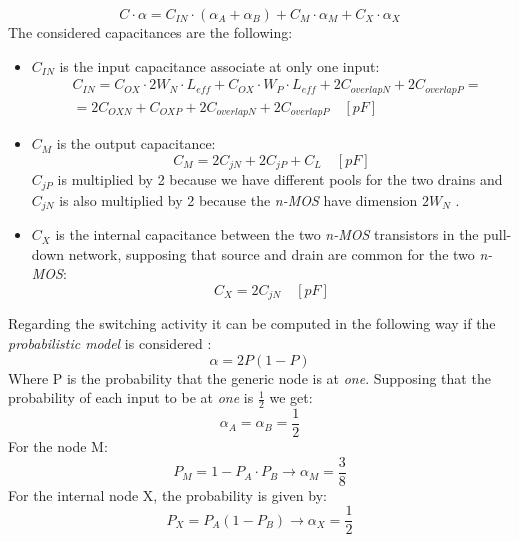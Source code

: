 \documentclass[12pt,  english, makeidx, a4paper, titlepage, oneside]{article}
\begin{document}
\begin{equation}
C \cdot \alpha = C_{IN} \cdot (\alpha_A + \alpha_B)+ C_M \cdot \alpha_M+C_X \cdot \alpha_X
\end{equation}
The considered capacitances are the following:
\begin{itemize}
	\item $C_{IN}$ is the input capacitance associate at only one input:
	\begin{equation}
	\begin{split}& 
	C_{IN}= C_{OX} \cdot 2W_N \cdot L_{eff} + C_{OX} \cdot W_P \cdot L_{eff} + 2C_{overlapN}+ 2C_{overlapP}=\\&
	 = 2C_{OXN} + C_{OXP} + 2C_{overlapN}+ 2C_{overlapP} \quad [pF]
	\end{split}
	\end{equation}
	
	\item $C_{M}$ is the output capacitance:
	\begin{equation}
	C_{M}=2C_{jN} + 2C_{jP}+C_L \quad [pF]
	\end{equation}
	$C_{jP}$ is multiplied by 2 because we have different pools for the two drains and $C_{jN}$ is also multiplied by 2 because the \textit{n-MOS} have dimension $2W_N$
	.
	\item $C_{X}$ is the internal capacitance between the two \textit{n-MOS} transistors in the pull-down network, supposing that source and drain are common for the two \textit{n-MOS}:
	\begin{equation}
	C_{X}=2C_{jN} \quad [pF]
	\end{equation}	
\end{itemize}
Regarding the switching activity it can be computed in the following way if the \textit{probabilistic model} is considered :
\begin{equation}
	\alpha=2P(1-P)
\end{equation}
Where P is the probability that the generic node is at \textit{one}.
Supposing that the probability of each input to be at \textit{one} is $\frac{1}{2}$ we get:
\begin{equation}
\alpha_A = \alpha_B = \frac{1}{2}
\end{equation}
For the node M:
\begin{equation}
P_M = 1-P_A \cdot P_B \rightarrow \alpha_M= \frac{3}{8}
\end{equation}
For the internal node X, the probability is given by:
\begin{equation}
P_X = P_A(1-P_B) \rightarrow \alpha_X= \frac{1}{2}
\end{equation}
\end{document}
